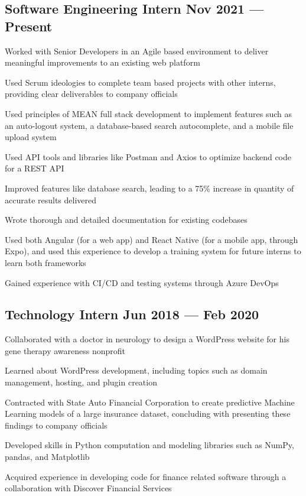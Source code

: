 \documentclass[letter,10pt]{article}
\begin{document}
\subsection{{Software Engineering Intern \hfill Nov 2021 --- Present}}
\begin{zitemize}
\item Worked with Senior Developers in an Agile based environment to deliver meaningful improvements to an existing web platform
\item Used Scrum ideologies to complete team based projects with other interns, providing clear deliverables to company officials
\item Used principles of MEAN full stack development to implement features such as an auto-logout system, a database-based search autocomplete, and a mobile file upload system
\item Used API tools and libraries like Postman and Axios to optimize backend code for a REST API
\item Improved features like database search, leading to a 75\% increase in quantity of accurate results delivered
\item Wrote thorough and detailed documentation for existing codebases
\item Used both Angular (for a web app) and React Native (for a mobile app, through Expo), and used this experience to develop a training system for future interns to learn both frameworks
\item Gained experience with CI/CD and testing systems through Azure DevOps
\end{zitemize}

\subsection{{Technology Intern \hfill Jun 2018 --- Feb 2020}}
\begin{zitemize}
\item Collaborated with a doctor in neurology to design a WordPress website for his gene therapy awareness nonprofit
\item Learned about WordPress development, including topics such as domain management, hosting, and plugin creation
\item Contracted with State Auto Financial Corporation to create predictive Machine Learning models of a large insurance dataset, concluding with presenting these findings to company officials
\item Developed skills in Python computation and modeling libraries such as NumPy, pandas, and Matplotlib
\item Acquired experience in developing code for finance related software through a collaboration with Discover Financial Services
\end{zitemize}
\end{document}
